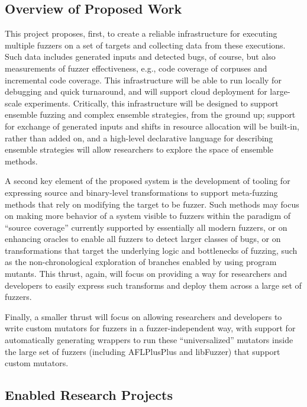 \documentclass[numbers]{proposalnsf}
\begin{document}
\subsection{Overview of Proposed Work}

This project proposes, first, to create a reliable infrastructure for executing multiple fuzzers on a set of targets and collecting data from these executions.  Such data includes generated inputs and detected bugs, of course, but also measurements of fuzzer effectiveness, e.g., code coverage of corpuses and incremental code coverage.  This infrastructure will be able to run locally for debugging and quick turnaround, and will support cloud deployment for large-scale experiments. Critically, this infrastructure will be designed to support ensemble fuzzing and complex ensemble strategies, from the ground up; support for exchange of generated inputs and shifts in resource allocation will be built-in, rather than added on, and a high-level declarative language for describing ensemble strategies will allow researchers to explore the space of ensemble methods.

A second key element of the proposed system is the development of tooling for expressing source and binary-level transformations to support meta-fuzzing methods that rely on modifying the target to be fuzzer.  Such methods may focus on making more behavior of a system visible to fuzzers within the paradigm of ``source coverage'' currently supported by essentially all modern fuzzers, or on enhancing oracles to enable all fuzzers to detect larger classes of bugs, or on transformations that target the underlying logic and bottlenecks of fuzzing, such as the non-chronological exploration of branches enabled by using program mutants.  This thrust, again, will focus on providing a way for researchers and developers to easily express such transforms and deploy them across a large set of fuzzers.

Finally, a smaller thrust will focus on allowing researchers and developers to write custom mutators for fuzzers in a fuzzer-independent way, with support for automatically generating wrappers to run these ``universalized'' mutators inside the large set of fuzzers (including AFLPlusPlus and libFuzzer) that support custom mutators.

\subsection{Enabled Research Projects}
\end{document}
